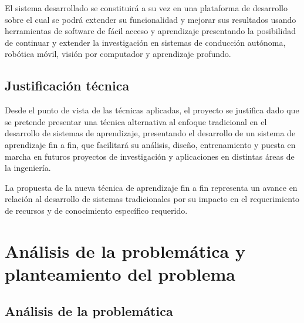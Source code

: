 El sistema desarrollado se constituirá a su vez en una plataforma de desarrollo sobre el cual se podrá 
extender su funcionalidad y mejorar sus resultados usando herramientas de software de fácil acceso y aprendizaje 
presentando la posibilidad de continuar y extender la investigación en sistemas de conducción autónoma, robótica móvil, 
visión por computador y aprendizaje profundo.

\subsection{Justificación técnica}

Desde el punto de vista de las técnicas aplicadas, el proyecto se justifica dado que se pretende presentar una técnica 
alternativa al enfoque tradicional en el desarrollo de sistemas de aprendizaje, presentando el desarrollo de un sistema 
de aprendizaje fin a fin, que facilitará su análisis, diseño, entrenamiento y puesta en marcha en futuros proyectos 
de investigación y aplicaciones en distintas áreas de la ingeniería. 

La propuesta de la nueva técnica de aprendizaje fin a fin representa un avance en relación al desarrollo de sistemas 
tradicionales por su impacto en el requerimiento de recursos y de conocimiento específico requerido.



\section{Análisis de la problemática y 
planteamiento del problema}
\subsection{Análisis de la problemática}


